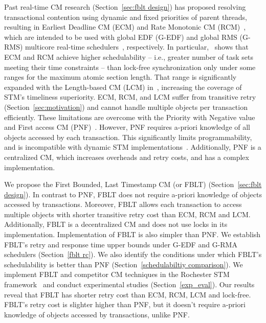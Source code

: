 \documentclass[conference]{IEEEtran}
\begin{document}
Past real-time CM research (Section~\ref{sec:fblt design}) has proposed resolving transactional contention using dynamic and fixed priorities of parent threads, resulting in Earliest Deadline CM (ECM) and Rate Monotonic CM (RCM)~\cite{6045438,stmconcurrencycontrol:emsoft11,lcmdac2012}, which are intended to be used with global EDF (G-EDF) and global RMS (G-RMS) multicore real-time schedulers~\cite{Davis:2011:SHR:1978802.1978814}, respectively.
In particular,~\cite{stmconcurrencycontrol:emsoft11} shows that ECM and RCM achieve higher schedulability -- i.e., greater number of task sets meeting their time constraints -- than lock-free synchronization only under some ranges for the maximum atomic section length. That range is significantly expanded with the Length-based CM (LCM) in~\cite{lcmdac2012}, increasing the coverage of STM's timeliness superiority. ECM, RCM, and LCM suffer from transitive retry (Section~\ref{sec:motivation}) and cannot handle multiple objects per transaction efficiently. These limitations are overcome with the Priority with Negative value and First access CM (PNF)~\cite{shambake_phd_proposal}. However, PNF requires a-priori knowledge of all objects accessed by each transaction. This significantly limits programmability, and is incompatible with dynamic STM implementations~\cite{Herlihy:2003:STM:872035.872048}. Additionally, PNF is a centralized CM, which increases overheads and retry costs, and has a complex implementation. 

We propose the First Bounded, Last Timestamp CM (or FBLT) (Section~\ref{sec:fblt design}). In contrast to PNF, FBLT does not require a-priori knowledge of objects accessed by transactions. Moreover, FBLT allows each transaction to access multiple objects with shorter transitive retry cost than ECM, RCM and LCM. Additionally, FBLT is a decentralized CM and does not use locks in its implementation. Implementation of FBLT is also simpler than PNF. We establish FBLT's retry and response time upper bounds under G-EDF and G-RMA schedulers (Section~\ref{fblt rc}). We also identify the conditions under which FBLT's schedulability is better than PNF (Section~\ref{schedulabiltiy comparison}). We implement FBLT and competitor CM techniques in the Rochester STM framework~\cite{marathe2006lowering} and conduct experimental studies (Section~\ref{exp_eval}). Our results reveal that FBLT has shorter retry cost than ECM, RCM, LCM and lock-free. FBLT's retry cost is slighter higher than PNF, but it doesn't require a-priori knowledge of objects accessed by transactions, unlike PNF. 
\end{document}

